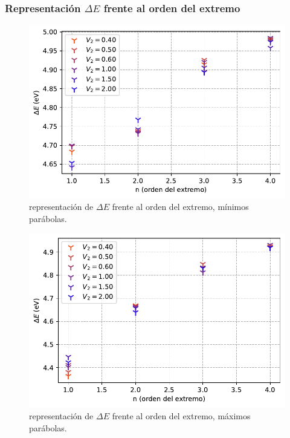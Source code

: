 \documentclass[12pt,a4paper]{article}
\numberwithin{equation}{section}
\numberwithin{figure}{section}
\begin{document}
\newpage

\subsubsection{Representación $\Delta E$ frente al orden del extremo}

\begin{figure}[h!]  \centering
\includegraphics[scale=1.]{Extremo-minimos-par.pdf}
\caption{representación de $\Delta E$ frente al orden del extremo, mínimos parábolas.}
\label{Fig:6.2.2.1}
\end{figure}


\begin{figure}[h!]  \centering
\includegraphics[scale=1.]{Extremo-maximos-par.pdf}
\caption{representación de $\Delta E$ frente al orden del extremo, máximos parábolas.}
\label{Fig:6.2.2.2}
\end{figure}
\end{document}
